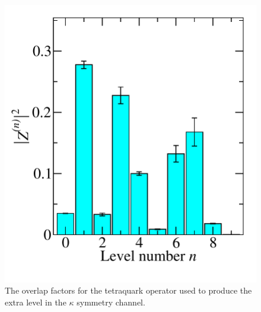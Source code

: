 \begin{figure}
  \includegraphics[scale=0.5]{figures/zfactors_a1g/zfactor_tqsuss2m-P000-A1g_1-SS_7.pdf}
  \caption{The overlap factors for the tetraquark operator used to produce the extra level in the $\kappa$ symmetry channel.}\label{fig:zkappa}
\end{figure}
